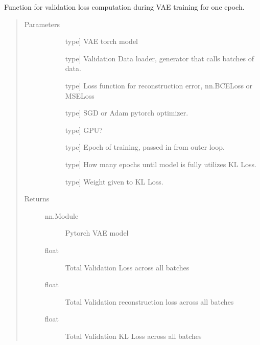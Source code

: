 \documentclass[letterpaper,10pt,english]{sphinxmanual}
\begin{document}
\begin{fulllineitems}
\label{\detokenize{index:methylnet.models.val_vae}}
Function for validation loss computation during VAE training for one epoch.
\begin{quote}\begin{description}
\item[{Parameters}] \leavevmode\begin{description}
\item[{}] \leavevmode{[}type{]}
VAE torch model

\item[{}] \leavevmode{[}type{]}
Validation Data loader, generator that calls batches of data.

\item[{}] \leavevmode{[}type{]}
Loss function for reconstruction error, nn.BCELoss or MSELoss

\item[{}] \leavevmode{[}type{]}
SGD or Adam pytorch optimizer.

\item[{}] \leavevmode{[}type{]}
GPU?

\item[{}] \leavevmode{[}type{]}
Epoch of training, passed in from outer loop.

\item[{}] \leavevmode{[}type{]}
How many epochs until model is fully utilizes KL Loss.

\item[{}] \leavevmode{[}type{]}
Weight given to KL Loss.

\end{description}

\item[{Returns}] \leavevmode\begin{description}
\item[{nn.Module}] \leavevmode
Pytorch VAE model

\item[{float}] \leavevmode
Total Validation Loss across all batches

\item[{float}] \leavevmode
Total Validation reconstruction loss across all batches

\item[{float}] \leavevmode
Total Validation KL Loss across all batches

\end{description}

\end{description}\end{quote}

\end{fulllineitems}
\end{document}
